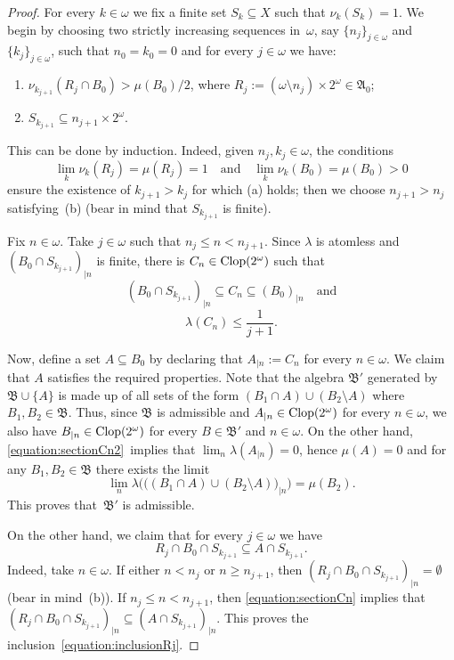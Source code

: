 \documentclass[12pt]{amsart}
\newcommand{\sm}{\setminus}
\newcommand{\sub}{\subseteq}
\newcommand{\alg}{\mathfrak A}
\newcommand{\algb}{\mathfrak B}
\newcommand{\clop}{\protect{\rm Clop} }
\newcommand{\0}{\protect{\bf 0}}
\newcommand{\1}{\protect{\bf 1}}
\theoremstyle{definition}
\theoremstyle{remark}
\numberwithin{equation}{section}
\begin{document}
\begin{proof} For every $k\in \omega$ we fix a finite set $S_k \sub X$
such that $\nu_k(S_k)=1$. We begin by choosing two strictly increasing sequences in~$\omega$, say
$\{n_j\}_{j\in \omega}$ and $\{k_j\}_{j\in \omega}$, such that
$n_0=k_0=0$ and for every $j\in \omega$ we have:
\begin{enumerate}
\item[(a)] $\nu_{k_{j+1}}(R_j\cap B_0)> \mu(B_0)/2$, where $R_j:=(\omega \sm n_j)\times 2^\omega \in \alg_0$;
\item[(b)] $S_{k_{j+1}}\sub n_{j+1}\times 2^\omega$.
\end{enumerate}
This can be done by induction. Indeed, given $n_j,k_j \in \omega$, the conditions
$$
	\lim_{k}\nu_{k}(R_j)=\mu(R_j)=1 
	\quad
	\mbox{and}
	\quad
	\lim_{k}\nu_k(B_0)= \mu(B_0)>0
$$
ensure the existence of $k_{j+1}>k_j$ for which (a) holds; then we choose $n_{j+1}>n_j$ satisfying~(b)
(bear in mind that $S_{k_{j+1}}$ is finite). 

Fix $n\in \omega$. Take $j\in \omega$ such that $n_j \leq n < n_{j+1}$. 
Since $\lambda$ is atomless and $(B_0 \cap S_{k_{j+1}})_{|n}$ is finite, there is
$C_n\in \clop(2^\omega)$ such that 
\begin{equation}\label{equation:sectionCn}
	(B_0 \cap S_{k_{j+1}})_{|n} \sub C_n \sub (B_0)_{|n} \quad\mbox{and}
\end{equation}
\begin{equation}\label{equation:sectionCn2}
	\lambda(C_n)\leq \frac{1}{j+1}.
\end{equation}

Now, define a set $A \sub B_0$ by declaring that $A_{|n}:=C_n$ for every $n\in \omega$. We claim that $A$ satisfies
the required properties. Note that the algebra $\algb'$
generated by $\algb\cup\{A\}$ is made up of all sets of the form
$(B_1\cap A) \cup (B_2\sm A)$ where $B_1,B_2\in \algb$. 
Thus, since $\algb$ is admissible and $A_{|n}\in \clop(2^\omega)$ for every $n\in \omega$, 
we also have $B_{|n}\in \clop(2^\omega)$ for every $B\in \algb'$ and $n\in \omega$. 
On the other hand, \eqref{equation:sectionCn2}~implies that $\lim_n\lambda(A_{|n})=0$, hence $\mu(A)=0$ and
for any $B_1,B_2\in \algb$ there exists the limit
$$
	\lim_n\lambda\Big(\big((B_1\cap A) \cup (B_2\sm A)\big)_{|n}\Big)=\mu(B_2).
$$
This proves that~$\algb'$ is admissible.

On the other hand, we claim that for every $j\in \omega$ we have 
\begin{equation}\label{equation:inclusionRj}
	R_j \cap B_0 \cap S_{k_{j+1}} \sub A\cap S_{k_{j+1}}.
\end{equation}
Indeed, take $n\in \omega$. If either $n<n_j$ or $n\geq n_{j+1}$, then 
$(R_j \cap B_0 \cap S_{k_{j+1}})_{|n}=\emptyset$ (bear in mind~(b)). If $n_j \leq n < n_{j+1}$, then 
\eqref{equation:sectionCn} implies that $(R_j \cap B_0 \cap S_{k_{j+1}})_{|n} \sub (A\cap S_{k_{j+1}})_{|n}$.
This proves the inclusion~\eqref{equation:inclusionRj}.


\end{proof}
\end{document}
